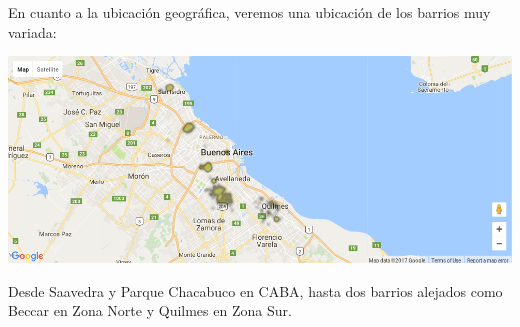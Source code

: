 \documentclass[a4paper, 10pt]{article}
\newcommand\tab[1][0.5cm]{\hspace*{#1}}
\begin{document}
            \tab En cuanto a la ubicación geográfica, veremos una ubicación de los barrios muy variada:
            \begin{center}
                  \includegraphics[width=\textwidth]{images/phSurfaceBottomMap}
            \end{center}
            \tab Desde Saavedra y Parque Chacabuco en CABA, hasta dos barrios alejados como Beccar en Zona Norte y Quilmes
            en Zona Sur.
\end{document}
